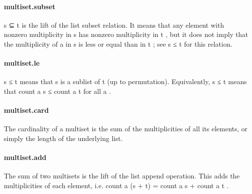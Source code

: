 \documentclass{article}
\begin{document}
\paragraph{multiset.subset}
\par
\colorbox[RGB]{253,246,227}{{{{\color[RGB]{101, 123, 131} s ⊆ t }}}} is the lift of the list subset relation. It means that any
element with nonzero multiplicity in 
\colorbox[RGB]{253,246,227}{{{{\color[RGB]{101, 123, 131} s }}}} has nonzero multiplicity in 
\colorbox[RGB]{253,246,227}{{{{\color[RGB]{101, 123, 131} t }}}},
but it does not imply that the multiplicity of 
\colorbox[RGB]{253,246,227}{{{{\color[RGB]{101, 123, 131} a }}}} in 
\colorbox[RGB]{253,246,227}{{{{\color[RGB]{101, 123, 131} s }}}} is less or equal than in 
\colorbox[RGB]{253,246,227}{{{{\color[RGB]{101, 123, 131} t }}}};
see 
\colorbox[RGB]{253,246,227}{{{{\color[RGB]{101, 123, 131} s  }}}{{{\color[RGB]{181, 137, 0} ≤ }}}{{{\color[RGB]{101, 123, 131}  t }}}} for this relation.
\paragraph{multiset.le}
\par
\colorbox[RGB]{253,246,227}{{{{\color[RGB]{101, 123, 131} s  }}}{{{\color[RGB]{181, 137, 0} ≤ }}}{{{\color[RGB]{101, 123, 131}  t }}}} means that 
\colorbox[RGB]{253,246,227}{{{{\color[RGB]{101, 123, 131} s }}}} is a sublist of 
\colorbox[RGB]{253,246,227}{{{{\color[RGB]{101, 123, 131} t }}}} (up to permutation).
Equivalently, 
\colorbox[RGB]{253,246,227}{{{{\color[RGB]{101, 123, 131} s  }}}{{{\color[RGB]{181, 137, 0} ≤ }}}{{{\color[RGB]{101, 123, 131}  t }}}} means that 
\colorbox[RGB]{253,246,227}{{{{\color[RGB]{101, 123, 131} count a s  }}}{{{\color[RGB]{181, 137, 0} ≤ }}}{{{\color[RGB]{101, 123, 131}  count a t }}}} for all 
\colorbox[RGB]{253,246,227}{{{{\color[RGB]{101, 123, 131} a }}}}.
\paragraph{multiset.card}
\par
The cardinality of a multiset is the sum of the multiplicities
of all its elements, or simply the length of the underlying list.
\paragraph{multiset.add}
\par
The sum of two multisets is the lift of the list append operation.
This adds the multiplicities of each element,
i.e. 
\colorbox[RGB]{253,246,227}{{{{\color[RGB]{101, 123, 131} count a (s  }}}{{{\color[RGB]{181, 137, 0} + }}}{{{\color[RGB]{101, 123, 131}  t)  }}}{{{\color[RGB]{181, 137, 0} = }}}{{{\color[RGB]{101, 123, 131}  count a s  }}}{{{\color[RGB]{181, 137, 0} + }}}{{{\color[RGB]{101, 123, 131}  count a t }}}}.
\end{document}
